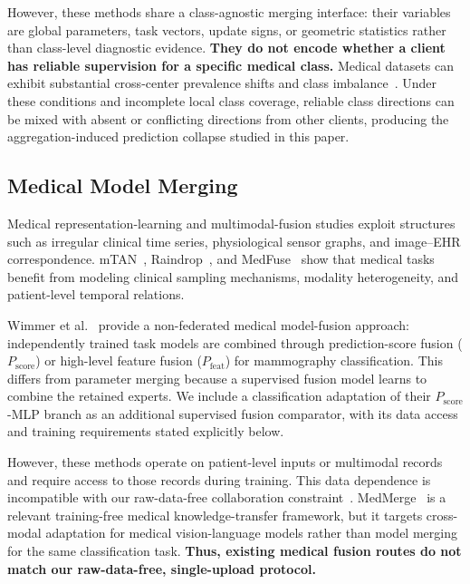 \documentclass[journal,twoside,web]{ieeecolor}
\begin{document}
However, these methods share a class-agnostic merging interface: their variables are global parameters, task vectors, update signs, or geometric statistics rather than class-level diagnostic evidence. \textbf{They do not encode whether a client has reliable supervision for a specific medical class.} Medical datasets can exhibit substantial cross-center prevalence shifts and class imbalance~\cite{10.1371/journal.pmed.1002683}. Under these conditions and incomplete local class coverage, reliable class directions can be mixed with absent or conflicting directions from other clients, producing the aggregation-induced prediction collapse studied in this paper.

\subsection{Medical Model Merging}

Medical representation-learning and multimodal-fusion studies exploit structures such as irregular clinical time series, physiological sensor graphs, and image--EHR correspondence. mTAN~\cite{shukla2021multitimeattentionnetworksirregularly}, Raindrop~\cite{zhang2022graphguidednetworkirregularlysampled}, and MedFuse~\cite{hayat2023medfusemultimodalfusionclinical} show that medical tasks benefit from modeling clinical sampling mechanisms, modality heterogeneity, and patient-level temporal relations.

Wimmer et al.~\cite{wimmer2022multitaskfusion} provide a non-federated medical model-fusion approach: independently trained task models are combined through prediction-score fusion ($P_{\mathrm{score}}$) or high-level feature fusion ($P_{\mathrm{feat}}$) for mammography classification. This differs from parameter merging because a supervised fusion model learns to combine the retained experts. We include a classification adaptation of their $P_{\mathrm{score}}$-MLP branch as an additional supervised fusion comparator, with its data access and training requirements stated explicitly below.

However, these methods operate on patient-level inputs or multimodal records and require access to those records during training. This data dependence is incompatible with our raw-data-free collaboration constraint~\cite{bonawitz2019towards}. MedMerge~\cite{11382027} is a relevant training-free medical knowledge-transfer framework, but it targets cross-modal adaptation for medical vision-language models rather than model merging for the same classification task. \textbf{Thus, existing medical fusion routes do not match our raw-data-free, single-upload protocol.}
\end{document}
